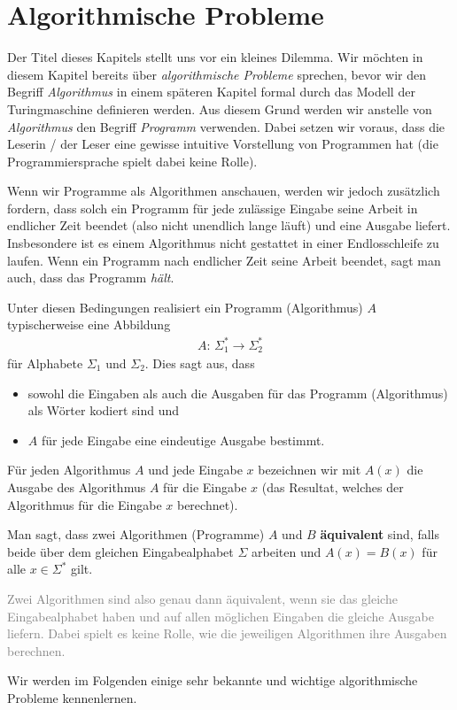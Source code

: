 \chapter{Algorithmische Probleme}

Der Titel dieses Kapitels stellt uns vor ein kleines Dilemma. Wir möchten in diesem Kapitel bereits über \textit{algorithmische Probleme} sprechen, bevor wir den Begriff \textit{Algorithmus} in einem späteren Kapitel formal durch das Modell der Turingmaschine definieren werden. Aus diesem Grund werden wir anstelle von \textit{Algorithmus} den Begriff \textit{Programm} verwenden. Dabei setzen wir voraus, dass die Leserin / der Leser eine gewisse intuitive Vorstellung von Programmen hat (die Programmiersprache spielt dabei keine Rolle).

Wenn wir Programme als Algorithmen anschauen, werden wir jedoch zusätzlich fordern, dass solch ein Programm für jede zulässige Eingabe seine Arbeit in endlicher Zeit beendet (also nicht unendlich lange läuft) und eine Ausgabe liefert. Insbesondere ist es einem Algorithmus nicht gestattet in einer Endlosschleife zu laufen. Wenn ein Programm nach endlicher Zeit seine Arbeit beendet, sagt man auch, dass das Programm \textit{hält}.

Unter diesen Bedingungen realisiert ein Programm (Algorithmus) $A$ typischerweise eine Abbildung
\begin{align*}
	A:\, \Sigma_1^* \to \Sigma_2^*
\end{align*}
für Alphabete $\Sigma_1$ und $\Sigma_2$. Dies sagt aus, dass
\begin{itemize}
	\item sowohl die Eingaben als auch die Ausgaben für das Programm (Algorithmus) als Wörter kodiert sind und
	\item $A$ für jede Eingabe eine eindeutige Ausgabe bestimmt.
\end{itemize}

Für jeden Algorithmus $A$ und jede Eingabe $x$ bezeichnen wir mit $A(x)$ die Ausgabe des Algorithmus $A$ für die Eingabe $x$ (das Resultat, welches der Algorithmus für die Eingabe $x$ berechnet).

\begin{mydefinition}\label{mydefinition:equivalence_algorithms}
Man sagt, dass zwei Algorithmen (Programme) $A$ und $B$ \textbf{äquivalent} sind, falls beide über dem gleichen Eingabealphabet $\Sigma$ arbeiten und $A(x) = B(x)$ für alle $x\in\Sigma^*$ gilt.

\textcolor{Gray}{Zwei Algorithmen sind also genau dann äquivalent, wenn sie das gleiche Eingabealphabet haben und auf allen möglichen Eingaben die gleiche Ausgabe liefern. Dabei spielt es keine Rolle, wie die jeweiligen Algorithmen ihre Ausgaben berechnen.}
\end{mydefinition}
Wir werden im Folgenden einige sehr bekannte und wichtige algorithmische Probleme kennenlernen.

